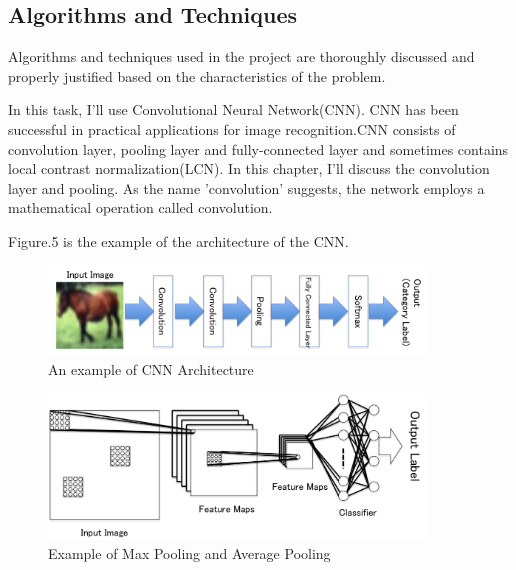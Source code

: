 \documentclass[a4paper,10pt,fleqn]{article}
\begin{document}
\subsection{Algorithms and Techniques}
Algorithms and techniques used in the project are thoroughly discussed and properly justified based on the characteristics of the problem.

In this task, I'll use Convolutional Neural Network(CNN). CNN has been successful in  practical applications for image recognition.CNN consists of convolution layer, pooling layer and fully-connected layer and sometimes contains local contrast normalization(LCN). In this chapter, I'll discuss the convolution layer and pooling.
As the name 'convolution' suggests, the network employs a mathematical operation called convolution. 

Figure.5 is the example of the architecture of the CNN.
\begin{figure}[htbp]

	\begin{center}
	\includegraphics[width=10cm]{picture/Architecture_of_CNN.png}
	\caption{An example of CNN Architecture}
	\end{center}
	\label{fig:five}

\end{figure}




\begin{figure}[htbp]

	\begin{center}
	\includegraphics[width=10cm]{picture/Structure_of_convolution.png}
	\caption{Example of Max Pooling and Average Pooling}
	\end{center}
	\label{fig:six}

\end{figure}
\end{document}
